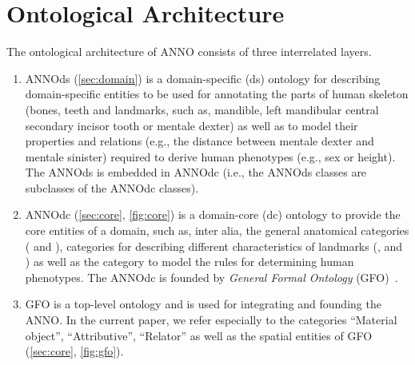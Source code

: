 \documentclass[sw]{iosart2x}
\newcommand{\aw}{AnthroWorks3D}
\begin{document}


\section{Ontological Architecture}\label{sec:architecture}

The ontological architecture of ANNO consists of three interrelated layers.

\begin{enumerate}
  
  \item ANNOds (\cref{sec:domain}) is a domain-specific (ds) ontology for describing domain-specific entities to be used for annotating 
the parts of human skeleton (bones, teeth and landmarks, such as, mandible, left mandibular central secondary incisor tooth 
or mentale dexter) as well as to model their properties and relations (e.g., the distance between mentale dexter and mentale sinister) 
required to derive human phenotypes (e.g., sex or height). The ANNOds is embedded in ANNOdc 
(i.e., the ANNOds classes are subclasses of the ANNOdc classes).
  
  \item ANNOdc (\cref{sec:core}, \cref{fig:core}) is a domain-core (dc) ontology to provide the core entities of a domain, such as, inter alia, 
the general anatomical categories ( and ), categories for describing different characteristics of 
landmarks (,  and ) as well as 
the category  to model the rules for determining human phenotypes. The ANNOdc is founded by \emph{General Formal Ontology} (GFO)~\citep{gfo}.
  
  \item GFO is a top-level ontology and is used for integrating and founding the ANNO. In the current paper, we refer especially to the categories 
\enquote{Material object}, \enquote{Attributive}, \enquote{Relator} as well as the spatial entities of GFO (\cref{sec:core}, \cref{fig:gfo}).
\end{enumerate}
\end{document}
